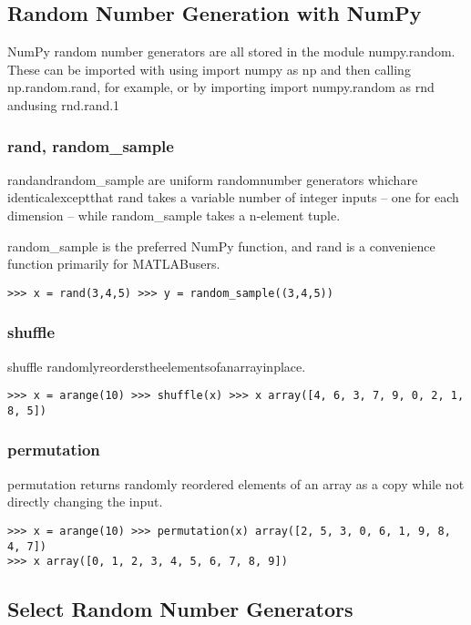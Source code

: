 \documentclass[KSmain.tex]{subfiles}
\begin{document}
 

\subsection{Random Number Generation with NumPy}
NumPy random number generators are all stored in the module numpy.random. These can be imported with using import numpy as np and then calling np.random.rand, for example, or by importing import numpy.random as rnd andusing rnd.rand.1
\subsubsection{rand, random\_sample}
randandrandom\_sample are uniform randomnumber generators whichare
 identicalexceptthat rand takes a variable number 
of integer inputs – one for each dimension – while random\_sample takes a n-element tuple. 

random\_sample is the preferred NumPy function, and rand is a convenience function primarily for MATLABusers.
\begin{framed}
\begin{verbatim}
>>> x = rand(3,4,5) >>> y = random_sample((3,4,5))
\end{verbatim}
\end{framed}

\subsubsection{shuffle}
shuffle randomlyreorderstheelementsofanarrayinplace.
\begin{verbatim}
>>> x = arange(10) >>> shuffle(x) >>> x array([4, 6, 3, 7, 9, 0, 2, 1, 8, 5])
\end{verbatim}
\subsubsection{permutation}
permutation returns randomly reordered elements of an array as a copy while not directly changing the input.
\begin{framed}
\begin{verbatim}
>>> x = arange(10) >>> permutation(x) array([2, 5, 3, 0, 6, 1, 9, 8, 4, 7])
>>> x array([0, 1, 2, 3, 4, 5, 6, 7, 8, 9])
\end{verbatim}
\end{framed}
\subsection{Select Random Number Generators}
\end{document}
